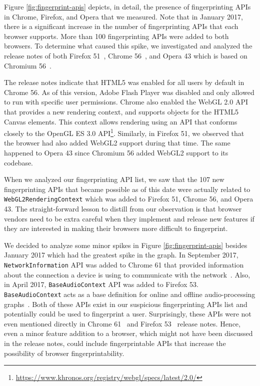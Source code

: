 Figure \ref{fig:fingerprint-apis} depicts, in detail, the presence of
fingerprinting APIs in Chrome, Firefox, and Opera that we measured. Note that
in January 2017, there is a significant increase in the number of
fingerprinting APIs that each browser supports. More than 100
fingerprinting APIs were added to both browsers. To determine what
caused this spike, we investigated and analyzed the release notes of
both Firefox 51~\cite{firefox-51-notes}, Chrome
56~\cite{chrome-56-notes}, and Opera 43 which is based on Chromium 56~\cite{opera-43-notes}.

The release notes indicate that HTML5 was enabled for all users by
default in Chrome 56. As of this version, Adobe Flash Player was
disabled and only allowed to run with specific user permissions.
Chrome also enabled the WebGL 2.0 API that provides a new rendering
context, and supports objects for the HTML5 Canvas elements. This
context allows rendering using an API that conforms closely to the
OpenGL ES 3.0
API\footnote{\url{https://www.khronos.org/registry/webgl/specs/latest/2.0/}}.
Similarly, in Firefox 51, we observed that the browser had also added
WebGL2 support during that time. The same happened to Opera 43 since Chromium 56
added WebGL2 support to its codebase.

When we analyzed our fingerprinting API list, we saw that the 107 new
fingerprinting APIs that became possible as of this date were actually
related to \texttt{WebGL2RenderingContext} which was added to Firefox
51, Chrome 56, and Opera 43. The straight-forward lesson to distill from our
observation is that browser vendors need to be extra careful when they
implement and release new features if they are interested in making
their browsers more difficult to fingerprint.

We decided to analyze some minor spikes in Figure \ref{fig:fingerprint-apis}
besides January 2017 which had the greatest spike in the graph.
In September 2017, \texttt{NetworkInformation} API was added to Chrome 61
that provided information about the connection a device is using to communicate with the network~\cite{network-information}.
Also, in April 2017, \texttt{BaseAudioContext} API was added to Firefox 53.
\texttt{BaseAudioContext} acts as a base definition for online and offline audio-processing graphs~\cite{base-audio-context}.
Both of these APIs exist in our suspicious fingerprinting APIs list and potentially could be used to fingerprint a user.
Surprisingly, these APIs were not even mentioned directly in Chrome 61~\cite{chrome-61-notes} and Firefox 53~\cite{firefox-53-notes} release notes.
Hence, even a minor feature addition to a browser, which might not have been discussed in the release notes, could
include fingerprintable APIs that increase the possibility of browser fingerprintability.

